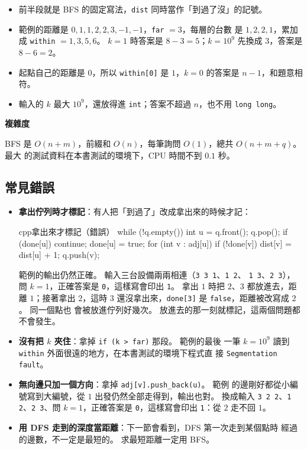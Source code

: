 \begin{itemize}
\item 前半段就是 BFS 的固定寫法，\texttt{dist} 同時當作「到過了沒」的記號。
\item 範例的距離是 $0, 1, 1, 2, 2, 3, -1, -1$，\texttt{far} $= 3$，每層的台數
是 $1, 2, 2, 1$，累加成 \texttt{within} $= 1, 3, 5, 6$。 $k = 1$ 時答案是
$8 - 3 = 5$；$k = 10^9$ 先換成 $3$，答案是 $8 - 6 = 2$。
\item 起點自己的距離是 $0$，所以 \texttt{within[0]} 是 $1$，$k = 0$ 的答案是
$n - 1$，和題意相符。
\item 輸入的 $k$ 最大 $10^9$，還放得進 \texttt{int}；答案不超過 $n$，也不用
\texttt{long long}。
\end{itemize}

\textbf{複雜度}

BFS 是 $O(n + m)$，前綴和 $O(n)$，每筆詢問 $O(1)$，總共 $O(n + m + q)$。 最大
的測試資料在本書測試的環境下，CPU 時間不到 $0.1$ 秒。

\subsection{常見錯誤}

\begin{itemize}
\item \textbf{拿出佇列時才標記}：有人把「到過了」改成拿出來的時候才記：
\begin{code}{cpp}{拿出來才標記（錯誤）}
while (!q.empty()) {
    int u = q.front();
    q.pop();
    if (done[u]) {
        continue;
    }
    done[u] = true;
    for (int v : adj[u]) {
        if (!done[v]) {
            dist[v] = dist[u] + 1;
            q.push(v);
        }
    }
}
\end{code}
範例的輸出仍然正確。 輸入三台設備兩兩相連（\texttt{3 3 1}、\texttt{1 2}、
\texttt{1 3}、\texttt{2 3}），問 $k = 1$，正確答案是 \texttt{0}，這樣寫會印出
\texttt{1}。 拿出 $1$ 時把 $2$、$3$ 都放進去，距離 $1$；接著拿出 $2$，這時 $3$
還沒拿出來，\texttt{done[3]} 是 \texttt{false}，距離被改寫成 $2$。 同一個點也
會被放進佇列好幾次。 放進去的那一刻就標記，這兩個問題都不會發生。
\item \textbf{沒有把 $k$ 夾住}：拿掉 \texttt{if (k > far)} 那段。 範例的最後
一筆 $k = 10^9$ 讀到 \texttt{within} 外面很遠的地方，在本書測試的環境下程式直
接 \texttt{Segmentation fault}。
\item \textbf{無向邊只加一個方向}：拿掉 \texttt{adj[v].push\_back(u)}。 範例
的邊剛好都從小編號寫到大編號，從 $1$ 出發仍然全部走得到，輸出也對。 換成輸入
\texttt{3 2 2}、\texttt{1 2}、\texttt{2 3}、問 $k = 1$，正確答案是
\texttt{0}，這樣寫會印出 \texttt{1}：從 $2$ 走不回 $1$。
\item \textbf{用 DFS 走到的深度當距離}：下一節會看到，DFS 第一次走到某個點時
經過的邊數，不一定是最短的。 求最短距離一定用 BFS。
\end{itemize}

